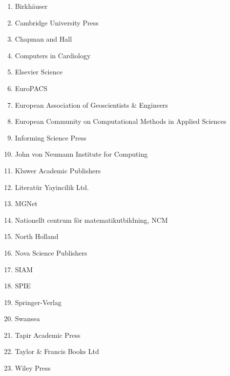 \begin{enumerate}
\item
 Birkh{\"a}user\\
\item
 Cambridge University Press\\
\item
 Chapman and Hall\\
\item
 Computers in Cardiology\\
\item
 Elsevier Science\\
\item
 EuroPACS\\
\item
 European Association of Geoscientists \& Engineers\\
\item
 European Community on Computational Methods in Applied Sciences\\
\item
 Informing Science Press\\
\item
 John von Neumann Institute for Computing\\
\item
 Kluwer Academic Publishers\\
\item
 Literat{\"u}r Yayincilik Ltd.\\
\item
 MGNet\\
\item
 Nationellt centrum f{\"o}r matematikutbildning, NCM\\
\item
 North Holland\\
\item
 Nova Science Publishers\\
\item
 SIAM\\
\item
 SPIE\\
\item
 Springer-Verlag\\
\item
 Swansea\\
\item
 Tapir Academic Press\\
\item
 Taylor \& Francis Books Ltd\\
\item
 Wiley Press\\
\end{enumerate}
